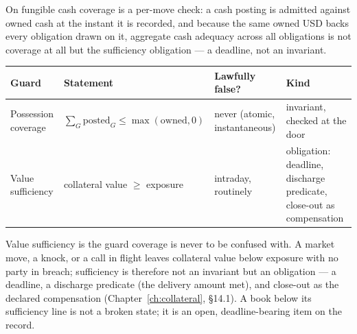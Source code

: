On fungible cash coverage is a per-move check: a cash posting is admitted against owned
cash at the instant it is recorded, and because the same owned USD backs every
obligation drawn on it, aggregate cash adequacy across all obligations is not coverage
at all but the sufficiency obligation --- a deadline, not an invariant.

\begin{center}
\begin{tabular}{@{}p{}p{}p{}p{}@{}}
\toprule
Guard & Statement & Lawfully false? & Kind \\
\midrule
Possession coverage & $\sum_G \mathrm{posted}_G \le \max(\mathrm{owned},0)$ & never (atomic, instantaneous) & invariant, checked at the door \\
Value sufficiency & collateral value $\ge$ exposure & intraday, routinely & obligation: deadline, discharge predicate, close-out as compensation \\
\bottomrule
\end{tabular}
\end{center}

\noindent Value sufficiency is the guard coverage is never to be confused with. A
market move, a knock, or a call in flight leaves collateral value below exposure
with no party in breach; sufficiency is therefore not an invariant but an
obligation --- a deadline, a discharge predicate (the delivery amount met), and
close-out as the declared compensation (Chapter~\ref{ch:collateral}, \S 14.1). A
book below its sufficiency line is not a broken state; it is an open,
deadline-bearing item on the record.


